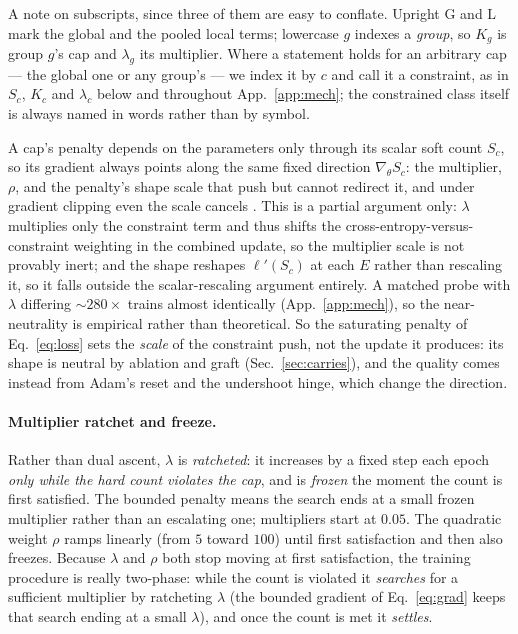 \documentclass[10pt]{article}
\begin{document}
{A note on subscripts, since three of them are easy to conflate.
Upright $\mathrm{G}$ and $\mathrm{L}$ mark the global and the pooled local terms;
lowercase $g$ indexes a \emph{group}, so $K_g$ is group $g$'s cap and
$\lambda_g$ its multiplier. Where a statement holds for an arbitrary cap --- the
global one or any group's --- we index it by $c$ and call it a constraint, as in
$S_c$, $K_c$ and $\lambda_c$ below and throughout App.~\ref{app:mech}; the
constrained class itself is always named in words rather than by symbol.}

A cap's penalty depends on the parameters only through its scalar soft count
$S_c$, so its gradient always points along the same fixed direction
$\nabla_\theta S_c$: the multiplier, $\rho$, and the penalty's shape scale
that push but cannot redirect it, and under gradient clipping even the scale
cancels \citep{pascanu2013difficulty}. This is a partial argument only:
$\lambda$ multiplies only the constraint term and thus shifts the
cross-entropy-versus-constraint weighting in the combined update, so the
multiplier scale is not provably inert; and the shape reshapes $\ell'(S_c)$
at each $E$ rather than rescaling it, so it falls outside the scalar-rescaling
argument entirely. A matched probe with $\lambda$ differing ${\sim}280\times$
trains almost identically (App.~\ref{app:mech}), so the near-neutrality is
empirical rather than theoretical. So the saturating penalty of
Eq.~\eqref{eq:loss} sets the \emph{scale} of the constraint push, not the
update it produces: its shape is neutral by ablation and graft
(Sec.~\ref{sec:carries}), and the quality comes instead from Adam's reset
and the undershoot hinge, which change the direction.

\paragraph{Multiplier ratchet and freeze.}
Rather than dual ascent, $\lambda$ is \emph{ratcheted}: it increases by a
fixed step each epoch \emph{only while the hard count violates the cap}, and
is \emph{frozen} the moment the count is first satisfied. The bounded
penalty means the search ends at a small frozen multiplier rather than an
escalating one; multipliers start at $0.05$. The quadratic weight $\rho$
ramps linearly (from $5$ toward $100$) until first satisfaction and then
also freezes. Because $\lambda$ and $\rho$ both stop moving at first
satisfaction, the training procedure is really two-phase: while the count
is violated it \emph{searches} for a sufficient multiplier by ratcheting
$\lambda$ (the bounded gradient of Eq.~\eqref{eq:grad} keeps that search
ending at a small $\lambda$), and once the count is met it \emph{settles}.
\end{document}
